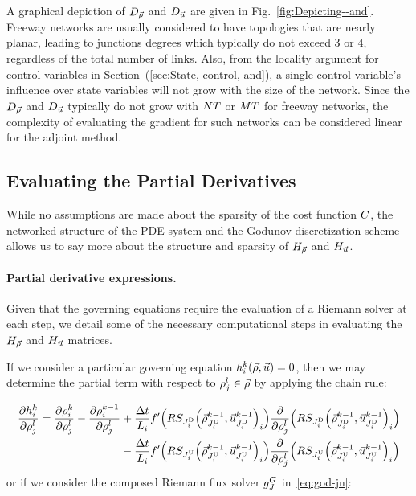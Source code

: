 A graphical depiction of $D_{\vec{\rho}}$ and $D_{\vec{u}}$ are given
in Fig.~\ref{fig:Depicting--and}. Freeway networks are usually considered to have topologies that are
nearly planar, leading to junctions degrees which typically do not
exceed 3 or 4, regardless of the total number of links. Also, from
the locality argument for control variables in Section~(\ref{sec:State,-control,-and}),
a single control variable's influence over state variables will not
grow with the size of the network. Since the $D_{\vec{\rho}}$ and
$D_{\vec{u}}$ typically do not grow with $NT$ or
$MT$ for freeway networks, the complexity of evaluating
the gradient for such networks can be considered linear for the adjoint
method.


\subsection{Evaluating the Partial Derivatives\label{sub:Evaluating--and}}

While no assumptions are made about the sparsity of the cost function
$C$, the networked-structure of the PDE system and the Godunov
discretization scheme allows us to say more about the structure and
sparsity of $H_{\vec{\rho}}$ and $H_{\vec{u}}$.


\paragraph{Partial derivative expressions.}

Given that the governing equations require the evaluation of a Riemann
solver at each step, we detail some of the necessary computational
steps in evaluating the $H_{\vec{\rho}}$ and $H_{\vec{u}}$ matrices. 

If we consider a particular governing equation $\syseq_{\link}^{\tind}\left(\state,\control\right)=0$,
then we may determine the partial term with respect to $\rho_{j}^{l}\in\vec{\rho}$
by applying the chain rule:

\begin{align}
\pfrac{\syseq_{\link}^{\tind}}{\discrete jl}=\pfrac{\discrete{\link}{\tind}}{\discrete jl}-\pfrac{\discrete{\link}{\tind-1}}{\discrete jl} & +\frac{\Delta t}{L_{i}}f'\left(\RS_{\jdown{\link}}\left(\juncstate{\jdown{\link}}{\tind-1},\junccon{\jdown{\link}}{\tind-1}\right)_{\link}\right)\pfrac{}{\discrete jl}\left(\RS_{\jdown{\link}}\left(\juncstate{\jdown{\link}}{\tind-1},\junccon{\jdown{\link}}{\tind-1}\right)_{\link}\right)\label{eq:dhdufull} \\
& -\frac{\Delta t}{L_{i}}f'\left(\RS_{\jup{\link}}\left(\juncstate{\jup{\link}}{\tind-1},\junccon{\jup{\link}}{\tind-1}\right)_{\link}\right)\pfrac{}{\discrete jl}\left(\RS_{\jup{\link}}\left(\juncstate{\jup{\link}}{\tind-1},\junccon{\jup{\link}}{\tind-1}\right)_{\link}\right)\nonumber                       
\end{align}				
or if we consider the composed Riemann flux solver $g^{G}_{J}$ in~\eqref{eq:god-jn}:

